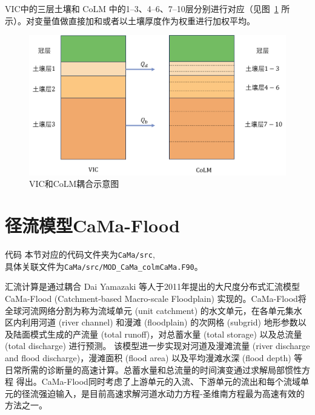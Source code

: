 \begin{enumerate}
    VIC中的三层土壤和 CoLM 中的1--3、4--6、7--10层分别进行对应（见图~\ref{fig:VIC和CoLM耦合示意图} 所示）。对变量值做直接加和或者以土壤厚度作为权重进行加权平均。

    {
      \begin{figure}[htbp]
        \centering
        \includegraphics[width=\textwidth]{Figures/陆地表面的水分循环/VIC说明图中文.pdf}
        \caption{VIC和CoLM耦合示意图}
        \label{fig:VIC和CoLM耦合示意图}
      \end{figure}
    }
\end{enumerate}

\section{径流模型CaMa-Flood}
\begin{mymdframed}{代码}
  本节对应的代码文件夹为\texttt{CaMa/src},\\具体关联文件为\texttt{CaMa/src/MOD\_CaMa\_colmCaMa.F90}。
\end{mymdframed}

汇流计算是通过耦合 Dai Yamazaki 等人于2011年提出的大尺度分布式汇流模型 CaMa-Flood (Catchment-based Macro-scale Floodplain) 实现的\citep{yamazaki2011physically}。CaMa-Flood将全球河流网络分割为称为流域单元 (unit catchment) 的水文单元，在各单元集水区内利用河道 (river channel) 和漫滩 (floodplain) 的次网格 (subgrid) 地形参数以及陆面模式生成的产流量 (total runoff)，对总蓄水量 (total storage) 以及总流量 (total discharge) 进行预测。
该模型进一步实现对河道及漫滩流量 (river discharge and flood discharge)，漫滩面积 (flood area) 以及平均漫滩水深 (flood depth) 等日常所需的诊断量的高速计算。总蓄水量和总流量的时间演变通过求解局部惯性方程 \citep{bates2010} 得出。CaMa-Flood同时考虑了上游单元的入流、下游单元的流出和每个流域单元的径流强迫输入，是目前高速求解河道水动力方程-圣维南方程最为高速有效的方法之一。


